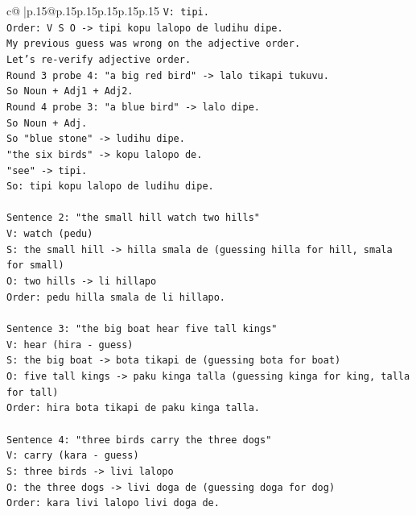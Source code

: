 \documentclass{article}
\begin{document}
{\begin{supertabular}{c@{$\;$}|p{.15\linewidth}@{}p{.15\linewidth}p{.15\linewidth}p{.15\linewidth}p{.15\linewidth}p{.15\linewidth}}
{{{\texttt{V: tipi.} \\
\texttt{Order: V S O {-}> tipi kopu lalopo de ludihu dipe.} \\
\texttt{My previous guess was wrong on the adjective order.} \\
\texttt{Let's re{-}verify adjective order.} \\
\texttt{Round 3 probe 4: "a big red bird" {-}> lalo tikapi tukuvu.} \\
\texttt{So Noun + Adj1 + Adj2.} \\
\texttt{Round 4 probe 3: "a blue bird" {-}> lalo dipe.} \\
\texttt{So Noun + Adj.} \\
\texttt{So "blue stone" {-}> ludihu dipe.} \\
\texttt{"the six birds" {-}> kopu lalopo de.} \\
\texttt{"see" {-}> tipi.} \\
\texttt{So: tipi kopu lalopo de ludihu dipe.} \\
\\ 
\texttt{Sentence 2: "the small hill watch two hills"} \\
\texttt{V: watch (pedu)} \\
\texttt{S: the small hill {-}> hilla smala de (guessing hilla for hill, smala for small)} \\
\texttt{O: two hills {-}> li hillapo} \\
\texttt{Order: pedu hilla smala de li hillapo.} \\
\\ 
\texttt{Sentence 3: "the big boat hear five tall kings"} \\
\texttt{V: hear (hira {-} guess)} \\
\texttt{S: the big boat {-}> bota tikapi de (guessing bota for boat)} \\
\texttt{O: five tall kings {-}> paku kinga talla (guessing kinga for king, talla for tall)} \\
\texttt{Order: hira bota tikapi de paku kinga talla.} \\
\\ 
\texttt{Sentence 4: "three birds carry the three dogs"} \\
\texttt{V: carry (kara {-} guess)} \\
\texttt{S: three birds {-}> livi lalopo} \\
\texttt{O: the three dogs {-}> livi doga de (guessing doga for dog)} \\
\texttt{Order: kara livi lalopo livi doga de.} \\
}}}
\end{supertabular}}
\end{document}
